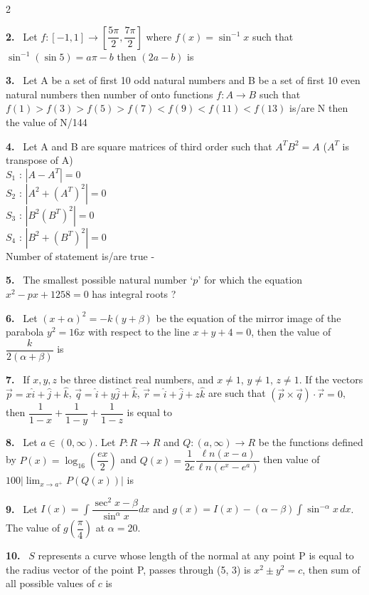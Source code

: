 \documentclass[10pt]{extarticle}
\newcommand{\qn}[1]{\par\smallskip\noindent\textbf{#1.}~}
\begin{document}
\begin{multicols}{2}
\qn{2} Let $f:[-1,1]\to\left[\dfrac{5\pi}2,\dfrac{7\pi}2\right]$ where $f(x)=\sin^{-1}x$ such that $\sin^{-1}(\sin5)=a\pi-b$ then $(2a-b)$ is \underline{\hspace{2em}}

\qn{3} Let A be a set of first 10 odd natural numbers and B be a set of first 10 even natural numbers then number of onto functions $f:A\to B$ such that $f(1)>f(3)>f(5)>f(7)<f(9)<f(11)<f(13)$ is/are N then the value of N/144

\qn{4} Let A and B are square matrices of third order such that $A^TB^2=A$ ($A^T$ is transpose of A)\\
$S_1$ : $\left|A-A^T\right|=0$\\
$S_2$ : $\left|A^2+\left(A^T\right)^2\right|=0$\\
$S_3$ : $\left|B^2\left(B^T\right)^2\right|=0$\\
$S_4$ : $\left|B^2+\left(B^T\right)^2\right|=0$\\
Number of statement is/are true -

\qn{5} The smallest possible natural number `$p$' for which the equation $x^2-px+1258=0$ has integral roots ?

\qn{6} Let $(x+\alpha)^2=-k(y+\beta)$ be the equation of the mirror image of the parabola $y^2=16x$ with respect to the line $x+y+4=0$, then the value of $\dfrac{k}{2(\alpha+\beta)}$ is

\qn{7} If $x,y,z$ be three distinct real numbers, and $x\neq1$, $y\neq1$, $z\neq1$. If the vectors $\vec p=x\hat i+\hat j+\hat k$, $\vec q=\hat i+y\hat j+\hat k$, $\vec r=\hat i+\hat j+z\hat k$ are such that $(\vec p\times\vec q)\cdot\vec r=0$, then $\dfrac1{1-x}+\dfrac1{1-y}+\dfrac1{1-z}$ is equal to

\qn{8} Let $a\in(0,\infty)$. Let $P:R\to R$ and $Q:(a,\infty)\to R$ be the functions defined by $P(x)=\log_{16}\left(\dfrac{ex}2\right)$ and $Q(x)=\dfrac1{2e}\dfrac{\ell n(x-a)}{\ell n\left(e^x-e^a\right)}$ then value of $100\left|\displaystyle\lim_{x\to a^+}P(Q(x))\right|$ is

\qn{9} Let $I(x)=\displaystyle\int\dfrac{\sec^2x-\beta}{\sin^\alpha x}dx$ and $g(x)=I(x)-(\alpha-\beta)\displaystyle\int\sin^{-\alpha}x\,dx$. The value of $g\left(\dfrac\pi4\right)$ at $\alpha=20$.

\qn{10} $S$ represents a curve whose length of the normal at any point P is equal to the radius vector of the point P, passes through (5, 3) is $x^2\pm y^2=c$, then sum of all possible values of $c$ is

\end{multicols}
\end{document}
